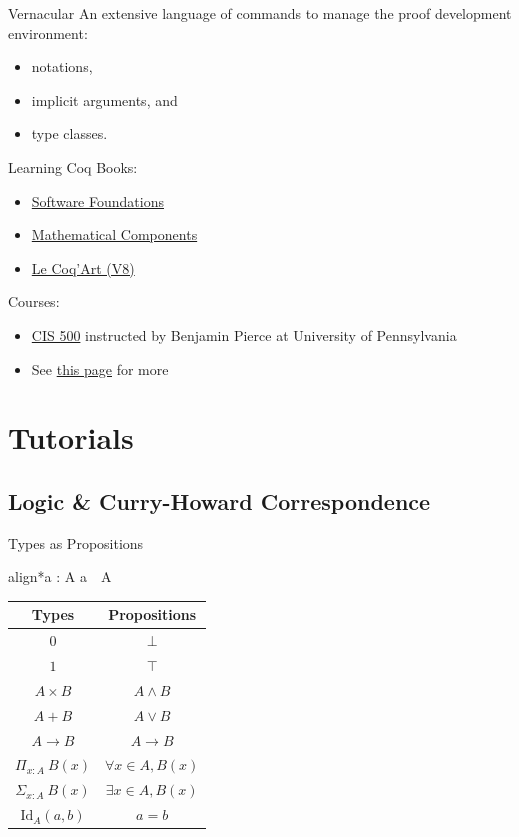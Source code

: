 \documentclass[usenames,xcolor=svgnames,11pt,sans,aspectratio=169]{beamer}
\newcommand{\boxedeq}[1]{\begin{empheq}[box=\fbox]{align*}#1\end{empheq}}
\begin{document}
\begin{frame}{Vernacular}
  An extensive language of commands to manage the proof development environment:
  \begin{itemize}
    \item notations,
    \item implicit arguments, and
    \item type classes.
  \end{itemize}
\end{frame}

\begin{frame}{Learning Coq}
  Books:
  \begin{itemize}
    \item \href{https://softwarefoundations.cis.upenn.edu}{Software Foundations}
    \item \href{https://math-comp.github.io/mcb/book.pdf}{Mathematical Components}
    \item \href{https://www.labri.fr/perso/casteran/CoqArt/coqartF.pdf}{Le Coq'Art (V8)}
  \end{itemize}

  Courses:
  \begin{itemize}
    \item \href{https://www.seas.upenn.edu/~cis500/current/index.html}{CIS 500} instructed by Benjamin Pierce at University of Pennsylvania
    \item See \href{https://github.com/coq/coq/wiki/CoqInTheClassroom}{this page} for more
  \end{itemize}
\end{frame}

\section{Tutorials}

\subsection{Logic \& Curry-Howard Correspondence}

\begin{frame}{Types as Propositions}
  \boxedeq{a : A \iff a~~A}

  \begin{center}
    \begin{tabular}{cc}
      Types & Propositions \\
      \hline
      $0$ & $\bot$ \\
      $1$ & $\top$ \\
      $A \times B$ & $A \land B$ \\
      $A + B$ & $A \lor B$ \\
      $A \to B$ & $A \to B$ \\
      $\Pi_{x: A}~B(x)$ & $\forall x \in A, B(x)$ \\
      $\Sigma_{x: A}~B(x)$ & $\exists x \in A, B(x)$ \\
      $\text{Id}_A(a, b)$ & $a = b$
    \end{tabular}
  \end{center}
\end{frame}
\end{document}

